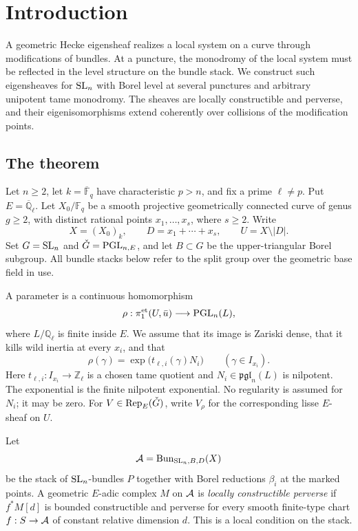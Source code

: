 \section{Introduction}\label{intro:section}

A geometric Hecke eigensheaf realizes a local system on a curve through modifications of bundles. At a puncture, the monodromy of the local system must be reflected in the level structure on the bundle stack. We construct such eigensheaves for $\operatorname{SL}_n$ with Borel level at several punctures and arbitrary unipotent tame monodromy. The sheaves are locally constructible and perverse, and their eigenisomorphisms extend coherently over collisions of the modification points.

\subsection{The theorem}
Let $n\ge2$, let $k=\overline{\mathbb F}_q$ have characteristic $p>n$, and fix a prime $\ell\ne p$. Put $E=\overline{\mathbb Q}_\ell$. Let $X_0/\mathbb F_q$ be a smooth projective geometrically connected curve of genus $g\ge2$, with distinct rational points $x_1,\ldots,x_s$, where $s\ge2$. Write
\[
 X=(X_0)_k,\qquad D=x_1+\cdots+x_s,\qquad U=X\setminus|D|.
\]
Set $G=\operatorname{SL}_n$ and $\check G=\operatorname{PGL}_{n,E}$, and let $B\subset G$ be the upper-triangular Borel subgroup. All bundle stacks below refer to the split group over the geometric base field in use.

A parameter is a continuous homomorphism
\begin{equation}\label{intro:parameter}
 \rho:\pi_1^{\mathrm{et}}(U,\bar u)\longrightarrow\operatorname{PGL}_n(L),
\end{equation}
where $L/\mathbb Q_\ell$ is finite inside $E$. We assume that its image is Zariski dense, that it kills wild inertia at every $x_i$, and that
\begin{equation}\label{intro:monodromy}
 \rho(\gamma)=\exp\bigl(t_{\ell,i}(\gamma)N_i\bigr)
 \qquad(\gamma\in I_{x_i}).
\end{equation}
Here $t_{\ell,i}:I_{x_i}\to\mathbb Z_\ell$ is a chosen tame quotient and $N_i\in\mathfrak{pgl}_n(L)$ is nilpotent. The exponential is the finite nilpotent exponential. No regularity is assumed for $N_i$; it may be zero. For $V\in\operatorname{Rep}_E(\check G)$, write $V_\rho$ for the corresponding lisse $E$-sheaf on $U$.

Let
\[
 \mathcal A=\operatorname{Bun}_{\operatorname{SL}_n,B,D}(X)
\]
be the stack of $\operatorname{SL}_n$-bundles $P$ together with Borel reductions $\beta_i$ at the marked points. A geometric $E$-adic complex $M$ on $\mathcal A$ is \emph{locally constructible perverse} if $f^*M[d]$ is bounded constructible and perverse for every smooth finite-type chart $f:S\to\mathcal A$ of constant relative dimension $d$. This is a local condition on the stack.

